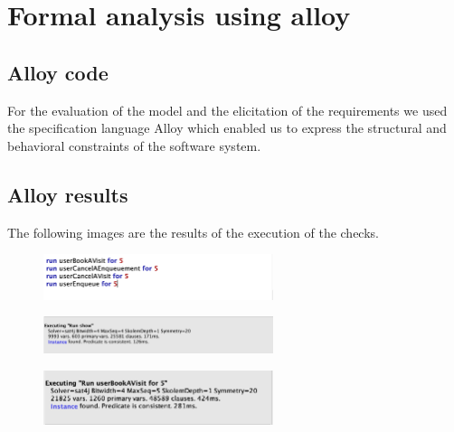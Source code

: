 \section{Formal analysis using alloy}
\label{sect:formalanalysisusingalloy}

\subsection{Alloy code}
\label{subsect:alloycode}

For the evaluation of the model and the elicitation of the requirements we used the specification language Alloy which enabled us to express the structural and behavioral constraints of the software system.


\subsection{Alloy results}
\label{subsect:alloyresults}

The following images are the results of the execution of the checks.

\begin{figure}[h!]
    \centering
    \includegraphics[width=0.6\textwidth]{Images/alloy/runs.png}
    \caption{\label{fig:runs}}
\end{figure}

\begin{figure}[h!]
    \centering
    \includegraphics[width=0.6\textwidth]{Images/alloy/runshow.png}
    \caption{\label{fig:runshow}}
\end{figure}

\begin{figure}[h!]
    \centering
    \includegraphics[width=0.6\textwidth]{Images/alloy/userbooksavisit.png}
    \caption{\label{fig:userbooksavisitalloy}}
\end{figure}

